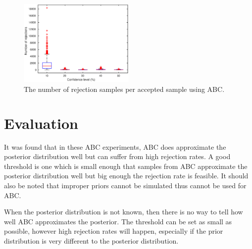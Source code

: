 \documentclass[a4paper]{proc}
\begin{document}
\begin{figure}
\includegraphics[width=0.5\textwidth]{rejections.eps}
\caption{The number of rejection samples per accepted sample using ABC.}
\label{rejections}
\end{figure}

\section{Evaluation}
It was found that in these ABC experiments, ABC does approximate the posterior distribution well but can suffer from high rejection rates. A good threshold is one which is small enough that samples from ABC approximate the posterior distribution well but big enough the rejection rate is feasible. It should also be noted that improper priors cannot be simulated thus cannot be used for ABC.

When the posterior distribution is not known, then there is no way to tell how well ABC approximates the posterior. The threshold can be set as small as possible, however high rejection rates will happen, especially if the prior distribution is very different to the posterior distribution.
\end{document}
